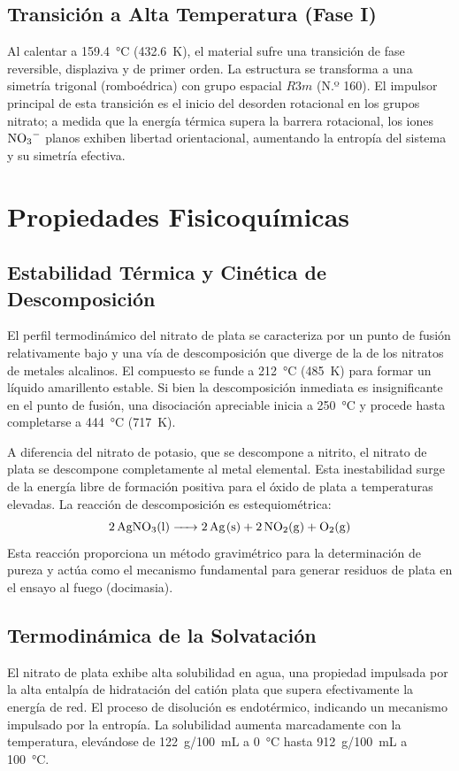 \documentclass[pdflatex,sn-mathphys-num,draft]{sn-jnl}
\theoremstyle{thmstyleone}%
\theoremstyle{thmstyletwo}%
\theoremstyle{thmstylethree}%
\begin{document}
\subsection{Transición a Alta Temperatura (Fase I)}
Al calentar a \qty{159.4}{\degreeCelsius} (\qty{432.6}{\kelvin}), el material
sufre una transición de fase reversible, displaziva y de primer orden. La
estructura se transforma a una simetría trigonal (romboédrica) con grupo
espacial $R3m$ (N.º 160). El impulsor principal de esta transición es el inicio
del desorden rotacional en los grupos nitrato; a medida que la energía térmica
supera la barrera rotacional, los iones $\ce{NO3-}$ planos exhiben libertad
orientacional, aumentando la entropía del sistema y su simetría efectiva.

\section{Propiedades Fisicoquímicas}
\label{sec:properties}

\subsection{Estabilidad Térmica y Cinética de Descomposición}
El perfil termodinámico del nitrato de plata se caracteriza por un punto de
fusión relativamente bajo y una vía de descomposición que diverge de la de los
nitratos de metales alcalinos. El compuesto se funde a \qty{212}{\degreeCelsius}
(\qty{485}{\kelvin}) para formar un líquido amarillento estable. Si bien la
descomposición inmediata es insignificante en el punto de fusión, una
disociación apreciable inicia a \qty{250}{\degreeCelsius} y procede hasta
completarse a \qty{444}{\degreeCelsius} (\qty{717}{\kelvin}).

A diferencia del nitrato de potasio, que se descompone a nitrito, el nitrato de
plata se descompone completamente al metal elemental. Esta inestabilidad surge
de la energía libre de formación positiva para el óxido de plata a temperaturas
elevadas. La reacción de descomposición es estequiométrica:
\begin{equation}
  \ce{2AgNO3(l) -> 2Ag(s) + 2NO2(g) + O2(g)}
\end{equation}
Esta reacción proporciona un método gravimétrico para la determinación de pureza
y actúa como el mecanismo fundamental para generar residuos de plata en el
ensayo al fuego (docimasia).

\subsection{Termodinámica de la Solvatación}
El nitrato de plata exhibe alta solubilidad en agua, una propiedad impulsada por
la alta entalpía de hidratación del catión plata que supera efectivamente la
energía de red. El proceso de disolución es endotérmico, indicando un mecanismo
impulsado por la entropía. La solubilidad aumenta marcadamente con la
temperatura, elevándose de \qty{122}{\gram}/\qty{100}{\milli\liter} a
\qty{0}{\degreeCelsius} hasta \qty{912}{\gram}/\qty{100}{\milli\liter} a
\qty{100}{\degreeCelsius}.
\end{document}
